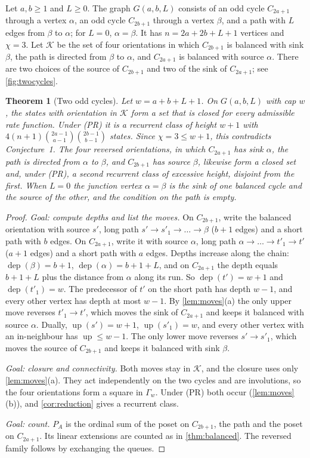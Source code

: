 \documentclass[11pt,a4paper]{article}
\newtheorem{theorem}{Theorem}[section]
\theoremstyle{plain}
\theoremstyle{plain}
\newcommand{\dep}{\operatorname{dep}}
\newcommand{\up}{\operatorname{up}}
\newcommand{\K}{\mathcal{K}}
\newcommand{\G}{\Gamma}
\begin{document}
Let $a,b\ge1$ and $L\ge0$. The graph $G(a,b,L)$ consists of an odd cycle $C_{2a+1}$ through a vertex $\alpha$, an odd cycle $C_{2b+1}$ through a vertex $\beta$, and a path with $L$ edges from $\beta$ to $\alpha$; for $L=0$, $\alpha=\beta$. It has $n=2a+2b+L+1$ vertices and $\chi=3$. Let $\K$ be the set of four orientations in which $C_{2b+1}$ is balanced with sink $\beta$, the path is directed from $\beta$ to $\alpha$, and $C_{2a+1}$ is balanced with source $\alpha$. There are two choices of the source of $C_{2b+1}$ and two of the sink of $C_{2a+1}$; see \cref{fig:twocycles}.

\begin{theorem}[Two odd cycles]\label{thm:twocycles}
Let $w=a+b+L+1$. On $G(a,b,L)$ with cap $w$, the states with orientation in $\K$ form a set that is closed for every admissible rate function. Under (PR) it is a recurrent class of height $w+1$ with $4(n+1)\binom{2a-1}{a-1}\binom{2b-1}{b-1}$ states. Since $\chi=3\le w+1$, this contradicts Conjecture~1. The four reversed orientations, in which $C_{2a+1}$ has sink $\alpha$, the path is directed from $\alpha$ to $\beta$, and $C_{2b+1}$ has source $\beta$, likewise form a closed set and, under (PR), a second recurrent class of excessive height, disjoint from the first. When $L=0$ the junction vertex $\alpha=\beta$ is the sink of one balanced cycle and the source of the other, and the condition on the path is empty.
\end{theorem}

\begin{proof}
\emph{Goal: compute depths and list the moves.} On $C_{2b+1}$, write the balanced orientation with source $s'$, long path $s'\to s'_1\to\dots\to\beta$ ($b+1$ edges) and a short path with $b$ edges. On $C_{2a+1}$, write it with source $\alpha$, long path $\alpha\to\dots\to t'_1\to t'$ ($a+1$ edges) and a short path with $a$ edges. Depths increase along the chain: $\dep(\beta)=b+1$, $\dep(\alpha)=b+1+L$, and on $C_{2a+1}$ the depth equals $b+1+L$ plus the distance from $\alpha$ along its run. So $\dep(t')=w+1$ and $\dep(t'_1)=w$. The predecessor of $t'$ on the short path has depth $w-1$, and every other vertex has depth at most $w-1$. By \cref{lem:moves}(a) the only upper move reverses $t'_1\to t'$, which moves the sink of $C_{2a+1}$ and keeps it balanced with source $\alpha$. Dually, $\up(s')=w+1$, $\up(s'_1)=w$, and every other vertex with an in-neighbour has $\up\le w-1$. The only lower move reverses $s'\to s'_1$, which moves the source of $C_{2b+1}$ and keeps it balanced with sink $\beta$.

\emph{Goal: closure and connectivity.} Both moves stay in $\K$, and the closure uses only \cref{lem:moves}(a). They act independently on the two cycles and are involutions, so the four orientations form a square in $\G_w$. Under (PR) both occur (\cref{lem:moves}(b)), and \cref{cor:reduction} gives a recurrent class.

\emph{Goal: count.} $P_A$ is the ordinal sum of the poset on $C_{2b+1}$, the path and the poset on $C_{2a+1}$. Its linear extensions are counted as in \cref{thm:balanced}. The reversed family follows by exchanging the queues.
\end{proof}
\end{document}
